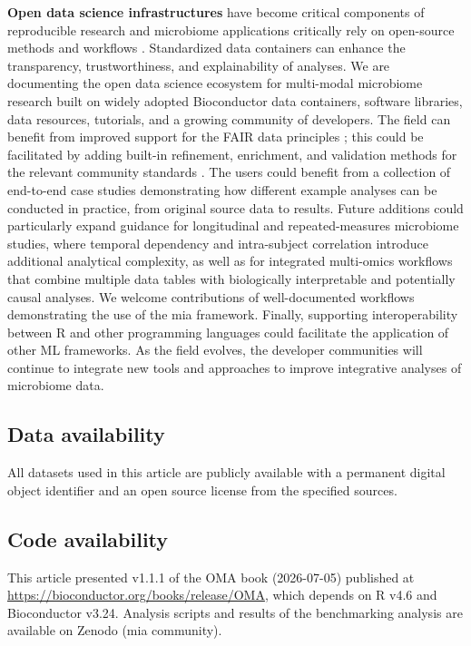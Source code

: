 \documentclass[
  sn-nature,
]{sn-jnl}
\begin{document}
\textbf{Open data science infrastructures} have become critical
components of reproducible research and microbiome applications
critically rely on open-source methods and workflows
\citep{berg2020, barker2022, hocquet2024}. Standardized data containers
can enhance the transparency, trustworthiness, and explainability of
analyses. We are documenting the open data science ecosystem for
multi-modal microbiome research built on widely adopted Bioconductor
data containers, software libraries, data resources, tutorials, and a
growing community of developers. The field can benefit from improved
support for the FAIR data principles \citep{wilkinson2016}; this could
be facilitated by adding built-in refinement, enrichment, and validation
methods for the relevant community standards
\citep{field2008, mirzayi2021, kelliher2025}. The users could benefit
from a collection of end-to-end case studies demonstrating how different
example analyses can be conducted in practice, from original source data
to results. Future additions could particularly expand guidance for
longitudinal and repeated-measures microbiome studies, where temporal
dependency and intra-subject correlation introduce additional analytical
complexity, as well as for integrated multi-omics workflows that combine
multiple data tables with biologically interpretable and potentially
causal analyses. We welcome contributions of well-documented workflows
demonstrating the use of the mia framework. Finally, supporting
interoperability between R and other programming languages could
facilitate the application of other ML frameworks. As the field evolves,
the developer communities will continue to integrate new tools and
approaches to improve integrative analyses of microbiome data.

\subsection{Data availability}\label{data-availability}

All datasets used in this article are publicly available with a
permanent digital object identifier and an open source license from the
specified sources.

\subsection{Code availability}\label{code-availability}

This article presented v1.1.1 of the OMA book (2026-07-05) published at
\url{https://bioconductor.org/books/release/OMA}, which depends on R
v4.6 and Bioconductor v3.24. Analysis scripts and results of the
benchmarking analysis are available on Zenodo (mia community).
\end{document}
